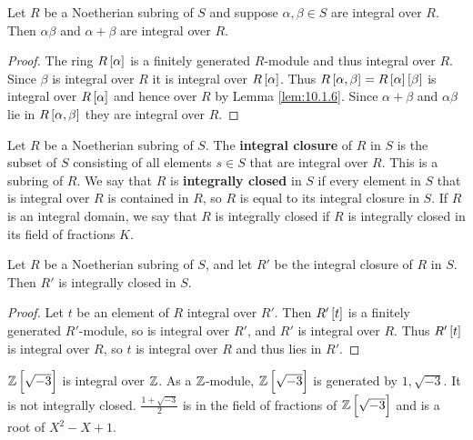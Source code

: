 \begin{corollary}
Let $ R $ be a Noetherian subring of $ S $ and suppose $ \alpha, \beta \in S $ are integral over $ R $. Then $ \alpha\beta $ and $ \alpha + \beta $ are integral over $ R $.
\end{corollary}

\begin{proof}
The ring $ R\sbr{\alpha} $ is a finitely generated $ R $-module and thus integral over $ R $. Since $ \beta $ is integral over $ R $ it is integral over $ R\sbr{\alpha} $. Thus $ R\sbr{\alpha, \beta} = R\sbr{\alpha}\sbr{\beta} $ is integral over $ R\sbr{\alpha} $ and hence over $ R $ by Lemma \ref{lem:10.1.6}. Since $ \alpha + \beta $ and $ \alpha\beta $ lie in $ R\sbr{\alpha, \beta} $ they are integral over $ R $.
\end{proof}


\begin{definition}
Let $ R $ be a Noetherian subring of $ S $. The \textbf{integral closure} of $ R $ in $ S $ is the subset of $ S $ consisting of all elements $ s \in S $ that are integral over $ R $. This is a subring of $ R $. We say that $ R $ is \textbf{integrally closed} in $ S $ if every element in $ S $ that is integral over $ R $ is contained in $ R $, so $ R $ is equal to its integral closure in $ S $. If $ R $ is an integral domain, we say that $ R $ is integrally closed if $ R $ is integrally closed in its field of fractions $ K $.
\end{definition}

\begin{lemma}
Let $ R $ be a Noetherian subring of $ S $, and let $ R' $ be the integral closure of $ R $ in $ S $. Then $ R' $ is integrally closed in $ S $.
\end{lemma}

\begin{proof}
Let $ t $ be an element of $ R $ integral over $ R' $. Then $ R'\sbr{t} $ is a finitely generated $ R' $-module, so is integral over $ R' $, and $ R' $ is integral over $ R $. Thus $ R'\sbr{t} $ is integral over $ R $, so $ t $ is integral over $ R $ and thus lies in $ R' $.
\end{proof}

\begin{example*}
$ \Z\sbr{\sqrt{-3}} $ is integral over $ \mathbb{Z} $. As a $ \mathbb{Z} $-module, $ \Z\sbr{\sqrt{-3}} $ is generated by $ 1, \sqrt{-3} $. It is not integrally closed. $ \tfrac{1 + \sqrt{-3}}{2} $ is in the field of fractions of $ \Z\sbr{\sqrt{-3}} $ and is a root of $ X^2 - X + 1 $.
\end{example*}

